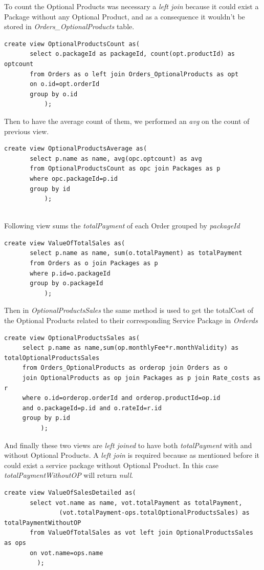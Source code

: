 \documentclass{article}
\begin{document}
To count the Optional Products was necessary a \emph{left join} because it could exist a Package without any Optional Product, and as a consequence it wouldn't be stored in \emph{Orders_OptionalProducts} table.
\begin{lstlisting}
create view OptionalProductsCount as(
       select o.packageId as packageId, count(opt.productId) as optcount
       from Orders as o left join Orders_OptionalProducts as opt
       on o.id=opt.orderId
       group by o.id
           );
\end{lstlisting}
Then to have the average count of them, we performed an \emph{avg} on the count of previous view.
\begin{lstlisting}
create view OptionalProductsAverage as(
       select p.name as name, avg(opc.optcount) as avg
       from OptionalProductsCount as opc join Packages as p
       where opc.packageId=p.id
       group by id
           );
           
\end{lstlisting}

Following view sums the \emph{totalPayment} of each Order grouped by \emph{packageId}
\begin{lstlisting}
create view ValueOfTotalSales as(
       select p.name as name, sum(o.totalPayment) as totalPayment
       from Orders as o join Packages as p
       where p.id=o.packageId
       group by o.packageId
           );
\end{lstlisting}
Then in \emph{OptionalProductsSales} the same method is used to get the totalCost of the Optional Products related to their corresponding Service Package in \emph{Orderds}
\begin{lstlisting}
create view OptionalProductsSales as(
     select p.name as name,sum(op.monthlyFee*r.monthValidity) as totalOptionalProductsSales
     from Orders_OptionalProducts as orderop join Orders as o
     join OptionalProducts as op join Packages as p join Rate_costs as r
     where o.id=orderop.orderId and orderop.productId=op.id 
     and o.packageId=p.id and o.rateId=r.id
     group by p.id
          );
\end{lstlisting}

And finally these two views are \emph{left joined} to have both \emph{totalPayment} with and without Optional Products. A \emph{left join} is required because as mentioned before it could exist a service package without Optional Product. In this case \emph{totalPaymentWithoutOP} will return \emph{null}.
\begin{lstlisting}
create view ValueOfSalesDetailed as(
       select vot.name as name, vot.totalPayment as totalPayment, 
               (vot.totalPayment-ops.totalOptionalProductsSales) as totalPaymentWithoutOP
       from ValueOfTotalSales as vot left join OptionalProductsSales as ops
       on vot.name=ops.name
         );
\end{lstlisting}                                     
\end{document}
